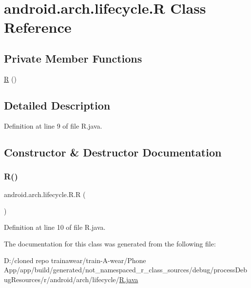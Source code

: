 \hypertarget{classandroid_1_1arch_1_1lifecycle_1_1_r}{}\section{android.\+arch.\+lifecycle.\+R Class Reference}
\label{classandroid_1_1arch_1_1lifecycle_1_1_r}
\subsection*{Private Member Functions}
\begin{DoxyCompactItemize}
\item 
\mbox{\hyperlink{classandroid_1_1arch_1_1lifecycle_1_1_r_aa089f6935ca5e6329cd1e03210fd9ea8}{R}} ()
\end{DoxyCompactItemize}


\subsection{Detailed Description}


Definition at line 9 of file R.\+java.



\subsection{Constructor \& Destructor Documentation}
\mbox{\label{classandroid_1_1arch_1_1lifecycle_1_1_r_aa089f6935ca5e6329cd1e03210fd9ea8}} 
\subsubsection{\texorpdfstring{R()}{R()}}
{\footnotesize\ttfamily android.\+arch.\+lifecycle.\+R.\+R (\begin{DoxyParamCaption}{ }\end{DoxyParamCaption})\hspace{0.3cm}{\ttfamily [private]}}



Definition at line 10 of file R.\+java.


\begin{DoxyCode}{0}

\end{DoxyCode}


The documentation for this class was generated from the following file\+:\begin{DoxyCompactItemize}
\item 
D\+:/cloned repo trainawear/train-\/\+A-\/wear/\+Phone App/app/build/generated/not\+\_\+namespaced\+\_\+r\+\_\+class\+\_\+sources/debug/process\+Debug\+Resources/r/android/arch/lifecycle/\mbox{\hyperlink{process_debug_resources_2r_2android_2arch_2lifecycle_2_r_8java}{R.\+java}}\end{DoxyCompactItemize}

